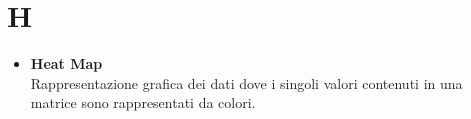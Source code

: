 \chapter{H} \label{H}
\begin{itemize}
	\item \textbf{Heat Map} \\
	 Rappresentazione grafica dei dati dove i singoli valori contenuti in una matrice sono rappresentati da colori.
\end{itemize}